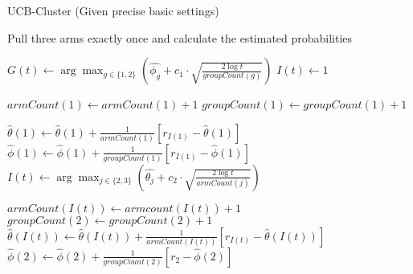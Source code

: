 \documentclass[11pt]{article}
\begin{document}
\begin{minipage}{17cm}
\begin{algorithm}[H]
    \caption{UCB-Cluster (Given precise basic settings)}
    \begin{algorithmic}[1]
            \State Pull three arms exactly once and calculate the estimated probabilities
        \EndFor
            
            \State $G(t) \leftarrow\arg\max_{g\in \{1,2\}}(\hat{\phi_g} + c_1 \cdot \sqrt{\frac{2\log t}{groupCount(g)}})$ 
            \State {}
                \State $I(t) \leftarrow 1$  
                
                \State $armCount(1) \leftarrow armCount(1) + 1$  
                \State $groupCount(1) \leftarrow groupCount(1) + 1$

                
                \State $\hat{\theta}(1) \leftarrow \hat{\theta}(1)  + \frac{1}{armCount(1)}\left[
                    r_{I(1)} - \hat{\theta}(1)
                \right]$ 
                \State $\hat{\phi}(1) \leftarrow \hat{\phi}(1)  + \frac{1}{groupCount(1)}\left[
                    r_{I(1)} - \hat{\phi}(1)
                \right]$ 
                \State $I(t) \leftarrow \arg\max_{
                    j\in \{2,3\}
                    } ( \hat{\theta_j} + c_2 \cdot 
                    \sqrt{\frac{2\log t}{armCount(j)}})$
                
                \State $armCount(I(t)) \leftarrow armcount(I(t)) + 1$  
                    \State $groupCount(2) \leftarrow groupCount(2) + 1$
                \State $\hat{\theta}(I(t)) \leftarrow \hat{\theta}(I(t))  + \frac{1}{armCount(I(t))}\left[
                    r_{I(t)} - \hat{\theta}(I(t))
                \right]$ 
                \State $\hat{\phi}(2) \leftarrow \hat{\phi}(2)  + \frac{1}{groupCount(2)}\left[
                    r_{2} - \hat{\phi}(2)
                \right]$  
            \EndIf
        \EndFor
    \end{algorithmic}
\end{algorithm}
\end{minipage}
\end{document}
